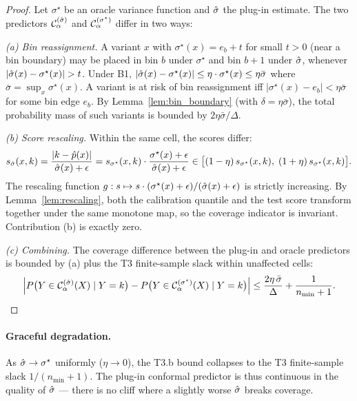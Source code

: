 \begin{proof}
Let $\sigma^\star$ be an oracle variance function and $\hat{\sigma}$ the plug-in estimate. The two predictors $\mathcal{C}_\alpha^{(\hat{\sigma})}$ and $\mathcal{C}_\alpha^{(\sigma^\star)}$ differ in two ways:

\textit{(a) Bin reassignment.}
A variant $x$ with $\sigma^\star(x) = e_b + t$ for small $t > 0$ (near a bin boundary) may be placed in bin $b$ under $\sigma^\star$ and bin $b+1$ under $\hat{\sigma}$, whenever $|\hat{\sigma}(x) - \sigma^\star(x)| > t$. Under B1, $|\hat{\sigma}(x) - \sigma^\star(x)| \leq \eta \cdot \sigma^\star(x) \leq \eta \bar\sigma$ where $\bar\sigma = \sup_x \sigma^\star(x)$. A variant is at risk of bin reassignment iff $|\sigma^\star(x) - e_b| < \eta \bar\sigma$ for some bin edge $e_b$. By Lemma~\ref{lem:bin_boundary} (with $\delta = \eta\bar\sigma$), the total probability mass of such variants is bounded by $2\eta\bar\sigma / \Delta$.

\textit{(b) Score rescaling.}
Within the same cell, the scores differ:
\[
s_{\hat{\sigma}}(x, k) = \frac{|k - \hat{p}(x)|}{\hat{\sigma}(x) + \epsilon}
= s_{\sigma^\star}(x, k) \cdot \frac{\sigma^\star(x) + \epsilon}{\hat{\sigma}(x) + \epsilon}
\in \bigl[(1-\eta)\, s_{\sigma^\star}(x, k),\; (1+\eta)\, s_{\sigma^\star}(x, k)\bigr].
\]
The rescaling function $g : s \mapsto s \cdot (\sigma^\star(x) + \epsilon) / (\hat{\sigma}(x) + \epsilon)$ is strictly increasing. By Lemma~\ref{lem:rescaling}, both the calibration quantile and the test score transform together under the same monotone map, so the coverage indicator is invariant. Contribution (b) is exactly zero.

\textit{(c) Combining.}
The coverage difference between the plug-in and oracle predictors is bounded by (a) plus the T3 finite-sample slack within unaffected cells:
\[
\left| P\bigl(Y \in \mathcal{C}_\alpha^{(\hat{\sigma})}(X) \mid Y = k\bigr)
- P\bigl(Y \in \mathcal{C}_\alpha^{(\sigma^\star)}(X) \mid Y = k\bigr) \right|
\leq \frac{2\eta\,\bar\sigma}{\Delta} + \frac{1}{n_{\min} + 1}. \qedhere
\]
\end{proof}

\paragraph{Graceful degradation.}
As $\hat{\sigma} \to \sigma^\star$ uniformly ($\eta \to 0$), the T3.b bound collapses to the T3 finite-sample slack $1/(n_{\min} + 1)$. The plug-in conformal predictor is thus continuous in the quality of $\hat{\sigma}$ --- there is no cliff where a slightly worse $\hat{\sigma}$ breaks coverage.


